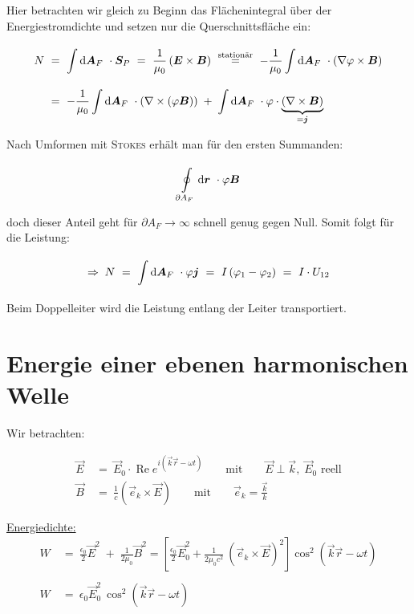 \begin{enumerate}[label=\roman*]
	Hier betrachten wir gleich zu Beginn das Flächenintegral über der Energiestromdichte und setzen nur die Querschnittsfläche ein:
	
	\begin{align*}
	N \ &= \ \Int{}{}{\vec{A}_F} \cdot \vec{S}_P \ = \ \frac{1}{\mu_0} \left(\vec{E}\times\vec{B}\right) \ \overset{\text{stationär}}{=} \ - \frac{1}{\mu_0} \Int{}{}{\vec{A}_F} \cdot \left(\nabla \varphi \times \vec{B}\right)\\
	&= \ - \frac{1}{\mu_0} \Int{}{}{\vec{A}_F} \cdot \left(\nabla\times\left(\varphi\vec{B}\right)\right) \; + \; \Int{}{}{\vec{A}_F}\cdot\varphi\cdot\underbrace{\left(\nabla\times\vec{B}\right)}_{=\vec{j}}
	\end{align*}
	
	Nach Umformen mit \textsc{Stokes} erhält man für den ersten Summanden:
	
	\begin{equation*}
	\oint\limits_{{\partial A_F}}^{{}}\mathrm{d}{\bm{r}}\   \cdot \varphi \bm{B}
	\end{equation*}
	
	doch dieser Anteil geht für $\partial A_F \rightarrow \infty$ schnell genug gegen Null. Somit folgt für die Leistung:
	
	\begin{equation*}
	\Rightarrow \; N \ = \ \Int{}{}{\vec{A}_F} \cdot \varphi \vec{j} \ = \ I \left(\varphi_1 - \varphi_2 \right) \ = \ I \cdot U_{12}
	\end{equation*}
	Beim Doppelleiter wird die Leistung entlang der Leiter transportiert.
\end{enumerate}


\section{Energie einer ebenen harmonischen Welle}

Wir betrachten:

\begin{align*}
\vec{E} \ &= \ \vec{E}_0 \cdot \operatorname{Re} e^{i\left(\vec{k}\vec{r}-\omega t\right)} \qquad \text{mit} \qquad \vec{E}\perp\vec{k}, \; \vec{E}_0 \text{ reell}\\
\vec{B} \ &= \ \frac{1}{c}\left(\vec{e}_k\times\vec{E}\right) \qquad \text{mit} \qquad \vec{e}_k = \frac{\vec{k}}{k}
\end{align*}

\underline{Energiedichte:}\\

\begin{align*}
W \ &= \ \frac{\epsilon_0}{2} \vec{E}^2 \; + \; \frac{1}{2\mu_0}\vec{B}^2 = \left[\frac{\epsilon_0}{2}\vec{E}_0^2 + \frac{1}{2\mu_0 c^2} \ \left(\vec{e}_k\times\vec{E}\right)^2\right] \cos^2\left(\vec{k}\vec{r}-\omega t\right)\\
\ \\
W \ &= \ \epsilon_0 \vec{E}_0^2 \ \cos^2\left(\vec{k}\vec{r}-\omega t\right)
\end{align*}

